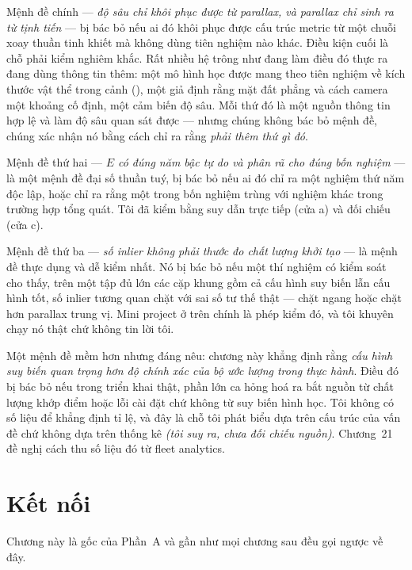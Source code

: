 \documentclass[../../vslam.tex]{subfiles}
\begin{document}
Mệnh đề chính --- \emph{độ sâu chỉ khôi phục được từ parallax, và parallax chỉ sinh ra từ tịnh tiến} --- bị bác bỏ nếu ai đó khôi phục được cấu trúc metric từ một chuỗi xoay thuần tinh khiết mà không dùng tiên nghiệm nào khác. Điều kiện cuối là chỗ phải kiểm nghiêm khắc. Rất nhiều hệ trông như đang làm điều đó thực ra đang dùng thông tin thêm: một mô hình học được mang theo tiên nghiệm về kích thước vật thể trong cảnh (), một giả định rằng mặt đất phẳng và cách camera một khoảng cố định, một cảm biến độ sâu. Mỗi thứ đó là một nguồn thông tin hợp lệ và làm độ sâu quan sát được --- nhưng chúng không bác bỏ mệnh đề, chúng xác nhận nó bằng cách chỉ ra rằng \emph{phải thêm thứ gì đó}.

Mệnh đề thứ hai --- \emph{\(E\) có đúng năm bậc tự do và phân rã cho đúng bốn nghiệm} --- là một mệnh đề đại số thuần tuý, bị bác bỏ nếu ai đó chỉ ra một nghiệm thứ năm độc lập, hoặc chỉ ra rằng một trong bốn nghiệm trùng với nghiệm khác trong trường hợp tổng quát. Tôi đã kiểm bằng suy dẫn trực tiếp (cửa a) và đối chiếu \cite[§9.6.2]{hartley2004} (cửa c).

Mệnh đề thứ ba --- \emph{số inlier không phải thước đo chất lượng khởi tạo} --- là mệnh đề thực dụng và dễ kiểm nhất. Nó bị bác bỏ nếu một thí nghiệm có kiểm soát cho thấy, trên một tập đủ lớn các cặp khung gồm cả cấu hình suy biến lẫn cấu hình tốt, số inlier tương quan chặt với sai số tư thế thật --- chặt ngang hoặc chặt hơn parallax trung vị. Mini project ở trên chính là phép kiểm đó, và tôi khuyên chạy nó thật chứ không tin lời tôi.

Một mệnh đề mềm hơn nhưng đáng nêu: chương này khẳng định rằng \emph{cấu hình suy biến quan trọng hơn độ chính xác của bộ ước lượng trong thực hành}. Điều đó bị bác bỏ nếu trong triển khai thật, phần lớn ca hỏng hoá ra bắt nguồn từ chất lượng khớp điểm hoặc lỗi cài đặt chứ không từ suy biến hình học. Tôi không có số liệu để khẳng định tỉ lệ, và đây là chỗ tôi phát biểu dựa trên cấu trúc của vấn đề chứ không dựa trên thống kê \emph{(tôi suy ra, chưa đối chiếu nguồn)}. Chương~21 đề nghị cách thu số liệu đó từ fleet analytics.

\section{Kết nối}

Chương này là gốc của Phần~A và gần như mọi chương sau đều gọi ngược về đây.
\end{document}

